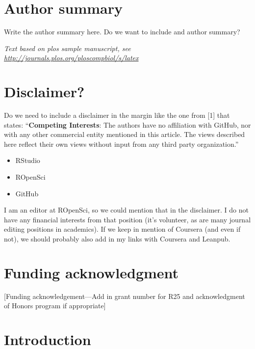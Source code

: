 \documentclass[10pt,letterpaper]{article}
\providecommand{\tightlist}{%
  \setlength{\itemsep}{0pt}\setlength{\parskip}{0pt}}
\begin{document}
\section*{Author summary}
Write the author summary here. Do we want to include and author summary?

\linenumbers

\emph{Text based on plos sample manuscript, see
\url{http://journals.plos.org/ploscompbiol/s/latex}}

\hypertarget{disclaimer}{%
\section{Disclaimer?}\label{disclaimer}}

Do we need to include a disclaimer in the margin like the one from
{[}1{]} that states: ``\textbf{Competing Interests}: The authors have no
affiliation with GitHub, nor with any other commercial entity mentioned
in this article. The views described here reflect their own views
without input from any third party organization.''

\begin{itemize}
\tightlist
\item
  RStudio
\item
  ROpenSci
\item
  GitHub
\end{itemize}

I am an editor at ROpenSci, so we could mention that in the disclaimer.
I do not have any financial interests from that position (it's
volunteer, as are many journal editing positions in academics). If we
keep in mention of Coursera (and even if not), we should probably also
add in my links with Coursera and Leanpub.

\hypertarget{funding-acknowledgment}{%
\section{Funding acknowledgment}\label{funding-acknowledgment}}

{[}Funding acknowledgement---Add in grant number for R25 and
acknowledgment of Honors program if appropriate{]}

\hypertarget{introduction}{%
\section{Introduction}\label{introduction}}
\end{document}
